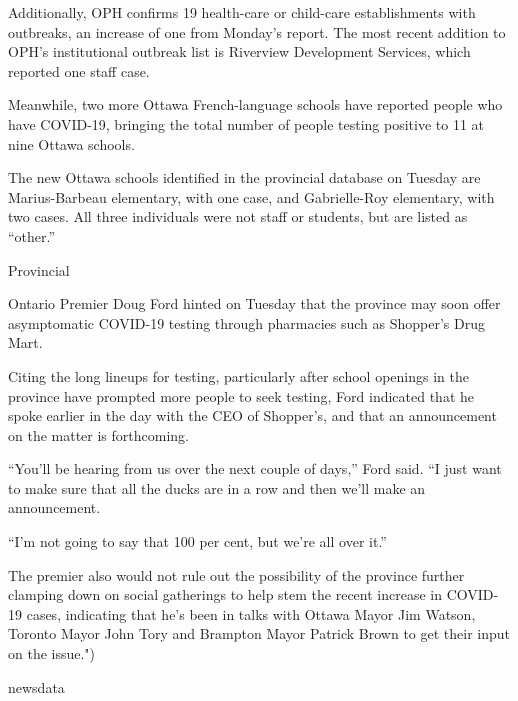 \documentclass[]{article}
\newenvironment{Shaded}{\begin{snugshade}}{\end{snugshade}}
\newcommand{\NormalTok}[1]{#1}
\newcommand{\StringTok}[1]{\textcolor[rgb]{0.31,0.60,0.02}{#1}}
\begin{document}
\begin{Shaded}
\begin{Highlighting}[]
\StringTok{Additionally, OPH confirms 19 health-care or child-care establishments with outbreaks, an increase of one from Monday’s report. The most recent addition to OPH’s institutional outbreak list is Riverview Development Services, which reported one staff case.}

\StringTok{Meanwhile, two more Ottawa French-language schools have reported people who have COVID-19, bringing the total number of people testing positive to 11 at nine Ottawa schools.}

\StringTok{The new Ottawa schools identified in the provincial database on Tuesday are Marius-Barbeau elementary, with one case, and Gabrielle-Roy elementary, with two cases. All three individuals were not staff or students, but are listed as “other.”}

\StringTok{Provincial}

\StringTok{Ontario Premier Doug Ford hinted on Tuesday that the province may soon offer asymptomatic COVID-19 testing through pharmacies such as Shopper’s Drug Mart.}

\StringTok{Citing the long lineups for testing, particularly after school openings in the province have prompted more people to seek testing, Ford indicated that he spoke earlier in the day with the CEO of Shopper’s, and that an announcement on the matter is forthcoming.}

\StringTok{“You’ll be hearing from us over the next couple of days,” Ford said. “I just want to make sure that all the ducks are in a row and then we’ll make an announcement.}

\StringTok{“I’m not going to say that 100 per cent, but we’re all over it.”}

\StringTok{The premier also would not rule out the possibility of the province further clamping down on social gatherings to help stem the recent increase in COVID-19 cases, indicating that he’s been in talks with Ottawa Mayor Jim Watson, Toronto Mayor John Tory and Brampton Mayor Patrick Brown to get their input on the issue."}\NormalTok{)}

\NormalTok{newsdata}
\end{Highlighting}
\end{Shaded}
\end{document}
